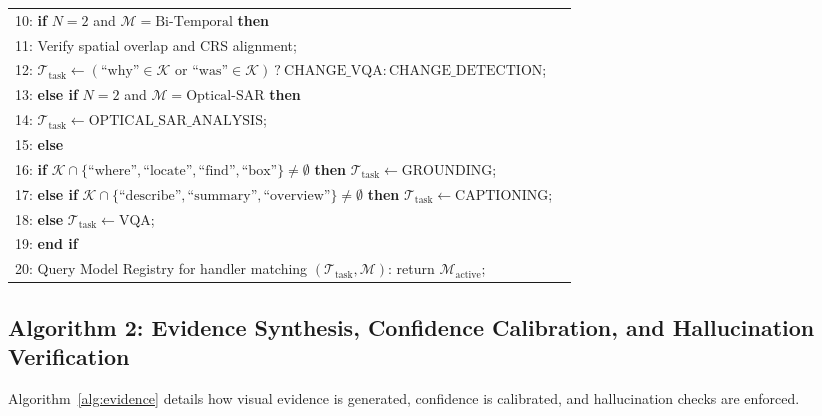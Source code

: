 \documentclass[12pt,a4paper]{report}
\begin{document}
\begin{singlespacing}
\begin{table}[htbp]
{\begin{tabular}{@{}p{0.98\linewidth}@{}}
10: \textbf{if} $N = 2$ and $\mathcal{M} = \text{Bi-Temporal}$ \textbf{then} \\
11: \quad Verify spatial overlap and CRS alignment; \\
12: \quad $\mathcal{T}_{\text{task}} \leftarrow (\text{``why''} \in \mathcal{K} \text{ or } \text{``was''} \in \mathcal{K}) \ ? \ \text{CHANGE\_VQA} : \text{CHANGE\_DETECTION}$; \\
13: \textbf{else if} $N = 2$ and $\mathcal{M} = \text{Optical-SAR}$ \textbf{then} \\
14: \quad $\mathcal{T}_{\text{task}} \leftarrow \text{OPTICAL\_SAR\_ANALYSIS}$; \\
15: \textbf{else} \\
16: \quad \textbf{if} $\mathcal{K} \cap \{\text{``where''}, \text{``locate''}, \text{``find''}, \text{``box''}\} \neq \emptyset$ \textbf{then} $\mathcal{T}_{\text{task}} \leftarrow \text{GROUNDING}$; \\
17: \quad \textbf{else if} $\mathcal{K} \cap \{\text{``describe''}, \text{``summary''}, \text{``overview''}\} \neq \emptyset$ \textbf{then} $\mathcal{T}_{\text{task}} \leftarrow \text{CAPTIONING}$; \\
18: \quad \textbf{else} $\mathcal{T}_{\text{task}} \leftarrow \text{VQA}$; \\
19: \textbf{end if} \\
20: Query Model Registry for handler matching $(\mathcal{T}_{\text{task}}, \mathcal{M})$: return $\mathcal{M}_{\text{active}}$; \\
\bottomrule
\end{tabular}%
}
\end{table}
\end{singlespacing}

\subsection{Algorithm 2: Evidence Synthesis, Confidence Calibration, and Hallucination Verification}
Algorithm~\ref{alg:evidence} details how visual evidence is generated, confidence is calibrated, and hallucination checks are enforced.
\end{document}
